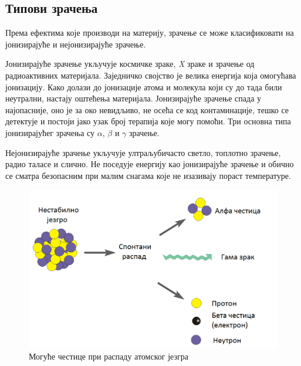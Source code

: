 \documentclass[12pt,a4paper,serbian,oneside]{book}
\begin{document}
\subsection{Типови зрачења}

Према ефектима које производи на материју, зрачење се може класификовати на јонизирајуће и нејонизирајуће зрачење.

Јонизирајуће зрачење укључује космичке зраке, \textit{X} зраке и зрачење од радиоактивних материјала. Заједничко својство је велика енергија која омогућава јонизацију. Како долази до јонизације атома и молекула који су до тада били неутрални, настају оштећења материјала. Јонизирајуће зрачење спада у најопасније, оно је за око невидљиво, не осећа се код контаминације, тешко се детектује и постоји јако узак број терапија које могу помоћи. Три основна типа јонизирајућег зрачења су $\alpha$, $\beta$ и $\gamma$ зрачење.

Нејонизирајуће зрачење укључује ултраљубичасто светло, топлотно зрачење, радио таласе и слично. Не поседује енергију као јонизирајуће зрачење и обично се сматра безопасним при малим снагама које не изазивају пораст температуре.

\begin{figure}[h]
\begin{center}
\leavevmode
\includegraphics[width=120mm]{images/radiation.png}
\end{center}
\caption{Могуће честице при распаду атомског језгра}
\label{fig:atom}
\end{figure}
\end{document}
